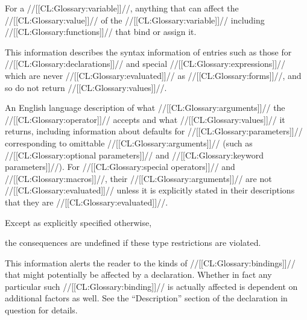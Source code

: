 For a //[[CL:Glossary:variable]]//, anything that can affect the //[[CL:Glossary:value]]// of the //[[CL:Glossary:variable]]// including //[[CL:Glossary:functions]]// that bind or assign it.

\endsubsubsection%


This information describes the syntax information of entries such as those for //[[CL:Glossary:declarations]]// and special //[[CL:Glossary:expressions]]// which are never //[[CL:Glossary:evaluated]]// as //[[CL:Glossary:forms]]//, and so do not return //[[CL:Glossary:values]]//.

\endsubsubsection%


An English language description of what //[[CL:Glossary:arguments]]// the //[[CL:Glossary:operator]]// accepts and what //[[CL:Glossary:values]]// it returns, including information about defaults for //[[CL:Glossary:parameters]]// corresponding to omittable //[[CL:Glossary:arguments]]// (such as //[[CL:Glossary:optional parameters]]// and //[[CL:Glossary:keyword parameters]]//). For //[[CL:Glossary:special operators]]// and //[[CL:Glossary:macros]]//, their //[[CL:Glossary:arguments]]// are not //[[CL:Glossary:evaluated]]// unless it is explicitly stated in their descriptions that they are //[[CL:Glossary:evaluated]]//.

Except as explicitly specified otherwise,

the consequences are undefined if these type restrictions are violated.

\endsubsubsection%


This information alerts the reader to the kinds of //[[CL:Glossary:bindings]]// that might  potentially be affected by a declaration.  Whether in fact any particular such //[[CL:Glossary:binding]]// is actually affected is dependent on additional factors as well. See the ``Description'' section of the declaration in question for details.

\endsubsubsection%

